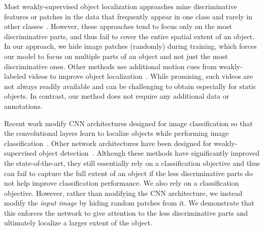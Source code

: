 \documentclass[10pt,twocolumn,letterpaper]{article}
\begin{document}
Most weakly-supervised object localization approaches mine discriminative features or patches in the data that frequently appear in one class and rarely in other classes~\cite{weber-eccv2000,fergus-cvpr2003,Crandall-ECCV2006,siva-eccv2012,bilen-bmcv2014,cinbis-cvpr2014,song-icml2014,song-nips2014,cinbis-arxiv2015}. However, these approaches tend to focus only on the most discriminative parts, and thus fail to cover the entire spatial extent of an object.  In our approach, we hide image patches (randomly) during training, which forces our model to focus on multiple parts of an object and not just the most discriminative ones.   Other methods use additional motion cues from weakly-labeled videos to improve object localization~\cite{prest-cvpr2012,krishna-cvpr2016}.  While promising, such videos are not always readily available and can be challenging to obtain especially for static objects.  In contrast, our method does not require any additional data or annotations.

Recent work modify CNN architectures designed for image classification so that the convolutional layers learn to localize objects while performing image classification~\cite{Oquab-cvpr15,zhou-cvpr2016}.  Other network architectures have been designed for weakly-supervised object detection~\cite{Jaderberg-nips2015,Bilen-cvpr2016,kantorov-eccv2016}.  Although these methods have significantly improved the state-of-the-art, they still essentially rely on a classification objective and thus can fail to capture the full extent of an object if the less discriminative parts do not help improve classification performance.  We also rely on a classification objective. However, rather than modifying the CNN architecture, we instead modify the \emph{input image} by hiding random patches from it.  We demonstrate that this enforces the network to give attention to the less discriminative parts and ultimately localize a larger extent of the object.
\end{document}
